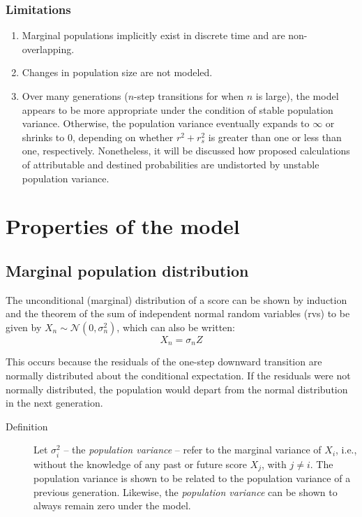 \documentclass[a4paper,11pt]{article} %
\begin{document}
\subsubsection*{Limitations}
\begin{enumerate}
\item Marginal populations implicitly exist in discrete time and are non-overlapping.
\item Changes in population size are not modeled. 
\item Over many generations ($n$-step transitions for when $n$ is large), the model appears to be more appropriate under the condition of stable population variance. Otherwise, the population variance eventually expands to $\infty$ or shrinks to $0$, depending on whether $r^2 + r_s^2$ is greater than one or less than one, respectively. Nonetheless, it will be discussed how proposed calculations of attributable and destined probabilities are undistorted by unstable population variance.
\end{enumerate}



\section{Properties of the model}
\subsection{Marginal population distribution}
The unconditional (marginal) distribution of a score can be shown by induction and the theorem of the sum of independent normal random variables (rvs) to be given by $X_n \sim \mathcal{N}(0, \sigma_n^2)$, which can also be written:
$$X_n = \sigma_nZ$$

This occurs because the residuals of the one-step downward transition are normally distributed about the conditional expectation. If the residuals were not normally distributed, the population would depart from the normal distribution in the next generation.

\begin{description}
\item [Definition] Let $\sigma_i^2$ -- the \emph{population variance} -- refer to the marginal variance of $X_i$, i.e., without the knowledge of any past or future score $X_{j}$, with $j \neq i$. The population variance is shown to be related to the population variance of a previous generation. Likewise, the \emph{population variance} can be shown to always remain zero under the model. 
\end{description}
\end{document}
